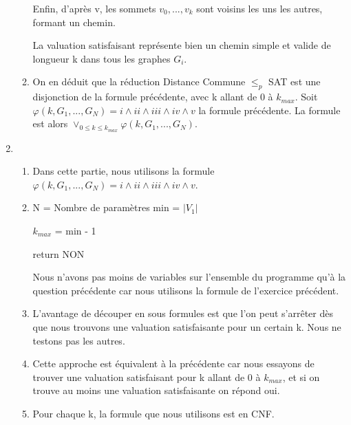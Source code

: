 \documentclass{article}
\begin{document}
\begin{enumerate}
\begin{enumerate}[label=(\alph*)]
Enfin, d'après v, les sommets $v_0, ..., v_k$ sont voisins les uns les autres, formant un chemin.\newline

La valuation satisfaisant représente bien un chemin simple et valide de longueur k dans tous les graphes $G_i$.
\newpage
\item 
On en déduit que la réduction Distance Commune $\le_p$ SAT est une disjonction de la formule précédente, avec k allant de 0 à $k_{max}$. \newline
Soit $\varphi(k, G_1, ..., G_N) = i \land ii \land iii \land iv \land v$ la formule précédente. La formule est alors 
$\lor_{0 \le k \le k_{max}} \varphi(k, G_1, ..., G_N)$.
\end{enumerate}
\item \begin{enumerate}[label=(\alph*)]
\item 
Dans cette partie, nous utilisons la formule $\varphi(k, G_1, ..., G_N) = i \land ii \land iii \land iv \land v$.
\item 

\begin{algorithm}
N = Nombre de paramètres\;
min = $|V_1|$\;


$k_{max}$ = min - 1\;
\BlankLine


return NON\;
\end{algorithm}

Nous n'avons pas moins de variables sur l'ensemble du programme qu'à la question précédente car nous utilisons la formule de l'exercice précédent.
\item 
L'avantage de découper en sous formules est que l'on peut s'arrêter dès que nous trouvons une valuation satisfaisante pour un certain k. Nous ne testons pas les autres.
\item 
Cette approche est équivalent à la précédente car nous essayons de trouver une valuation satisfaisant pour k allant de 0 à $k_{max}$, et si on trouve au moins une valuation satisfaisante on répond oui.
\item Pour chaque k, la formule que nous utilisons est en CNF.

\end{enumerate}
\end{enumerate}
\end{document}
